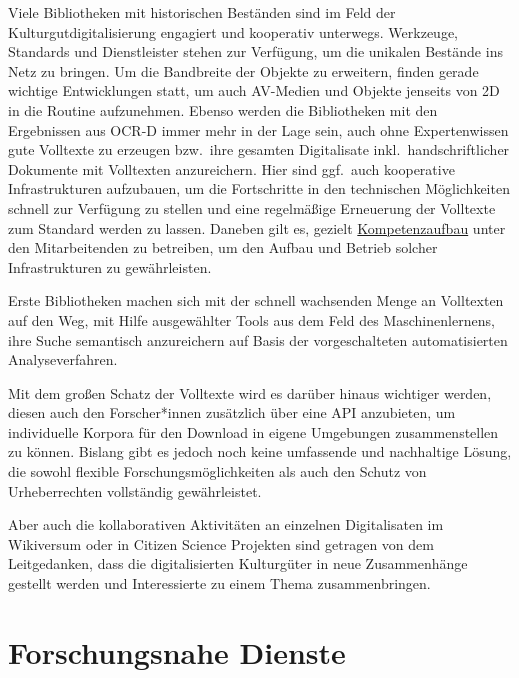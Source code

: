 \documentclass[
  11pt,
  letterpaper,
  DIV=11,
  twoside]{scrreprt}
\begin{document}
Viele Bibliotheken mit historischen Beständen sind im Feld der
Kulturgutdigitalisierung engagiert und kooperativ unterwegs. Werkzeuge,
Standards und Dienstleister stehen zur Verfügung, um die unikalen
Bestände ins Netz zu bringen. Um die Bandbreite der Objekte zu
erweitern, finden gerade wichtige Entwicklungen statt, um auch AV-Medien
und Objekte jenseits von 2D in die Routine aufzunehmen. Ebenso werden
die Bibliotheken mit den Ergebnissen aus OCR-D immer mehr in der Lage
sein, auch ohne Expertenwissen gute Volltexte zu erzeugen bzw.~ihre
gesamten Digitalisate inkl.~handschriftlicher Dokumente mit Volltexten
anzureichern. Hier sind ggf.~auch kooperative Infrastrukturen
aufzubauen, um die Fortschritte in den technischen Möglichkeiten schnell
zur Verfügung zu stellen und eine regelmäßige Erneuerung der Volltexte
zum Standard werden zu lassen. Daneben gilt es, gezielt
\hyperref[kompetenzen]{Kompetenzaufbau} unter den Mitarbeitenden zu
betreiben, um den Aufbau und Betrieb solcher Infrastrukturen zu
gewährleisten.

Erste Bibliotheken machen sich mit der schnell wachsenden Menge an
Volltexten auf den Weg, mit Hilfe ausgewählter Tools aus dem Feld des
Maschinenlernens, ihre Suche semantisch anzureichern auf Basis der
vorgeschalteten automatisierten Analyseverfahren.

Mit dem großen Schatz der Volltexte wird es darüber hinaus wichtiger
werden, diesen auch den Forscher*innen zusätzlich über eine API
anzubieten, um individuelle Korpora für den Download in eigene
Umgebungen zusammenstellen zu können. Bislang gibt es jedoch noch keine
umfassende und nachhaltige Lösung, die sowohl flexible
Forschungsmöglichkeiten als auch den Schutz von Urheberrechten
vollständig gewährleistet.

Aber auch die kollaborativen Aktivitäten an einzelnen Digitalisaten im
Wikiversum oder in Citizen Science Projekten sind getragen von dem
Leitgedanken, dass die digitalisierten Kulturgüter in neue Zusammenhänge
gestellt werden und Interessierte zu einem Thema zusammenbringen.


\chapter{Forschungsnahe Dienste}\label{sec-forschungsnahe-dienste}
\end{document}
